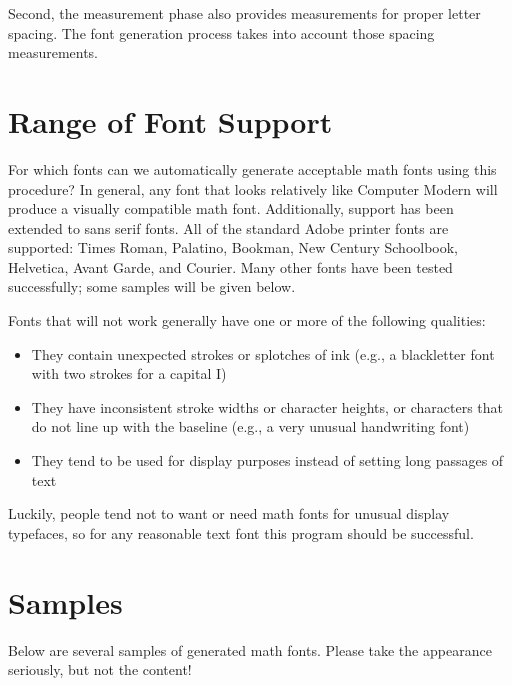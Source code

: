 \documentclass[preprint]{ltugproc}
\begin{document}
Second, the measurement phase also provides measurements for proper letter
spacing. The font generation process takes into account those spacing
measurements.

\section{Range of Font Support}

For which fonts can we automatically generate acceptable math fonts using this
procedure? In general, any font that looks relatively like Computer Modern will
produce a visually compatible math font. Additionally, support has been extended
to sans serif fonts. All of the standard Adobe printer fonts are supported:
Times Roman, Palatino, Bookman, New Century Schoolbook, Helvetica, Avant Garde,
and Courier. Many other fonts have been tested successfully; some samples will
be given below.

Fonts that will not work generally have one or more of the following qualities:
\begin{itemize}
\item They contain unexpected strokes or splotches of ink (e.g., a blackletter
font with two strokes for a capital I)
\item They have inconsistent stroke widths or character heights, or characters
that do not line up with the baseline (e.g., a very unusual handwriting font)
\item They tend to be used for display purposes instead of setting long passages
of text
\end{itemize}
Luckily, people tend not to want or need math fonts for unusual display
typefaces, so for any reasonable text font this program should be successful.

\section{Samples}

Below are several samples of generated math fonts. Please take the appearance
seriously, but not the content!
\end{document}
